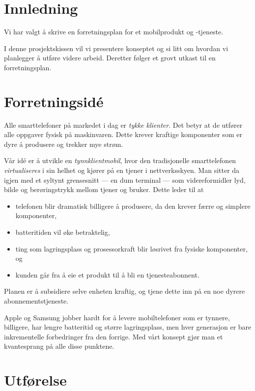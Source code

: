 \section{Innledning}

Vi har valgt å skrive en forretningsplan for et mobilprodukt og -tjeneste.

I denne prosjektskissen vil vi presentere konseptet og si litt om hvordan vi
planlegger å utføre videre arbeid. Deretter følger et grovt utkast til en
forretningsplan.

\section{Forretningsidé}

Alle smarttelefoner på markedet i dag er \textit{tykke klienter}. Det betyr at
de utfører alle oppgaver fysisk på maskinvaren. Dette krever kraftige
komponenter som er dyre å produsere og trekker mye strøm.

Vår idé er å utvikle en \textit{tynnklientmobil}, hvor den tradisjonelle
smarttelefonen \textit{virtualiseres} i sin helhet og kjører på en tjener i
nettverksskyen. Man sitter da igjen med et syltynt grensesnitt --- en dum terminal ---
som videreformidler lyd, bilde og berøringstrykk mellom tjener og bruker. Dette
leder til at
%
\begin{itemize}
  \item telefonen blir dramatisk billigere å produsere, da den krever færre og
    simplere komponenter,
  \item batteritiden vil øke betraktelig,
  \item ting som lagringsplass og prosessorkraft blir løsrivet fra fysiske
    komponenter, og
  \item kunden går fra å eie et produkt til å bli en tjenesteabonnent.
\end{itemize}

Planen er å subsidiere selve enheten kraftig, og tjene dette inn på en noe
dyrere abonnementstjeneste.

Apple og Samsung jobber hardt for å levere mobiltelefoner som er tynnere,
billigere, har lengre batteritid og større lagringsplass, men hver generasjon
er bare inkrementelle forbedringer fra den forrige.  Med vårt konsept gjør man
et kvantesprang på alle disse punktene.

\section{Utførelse}

